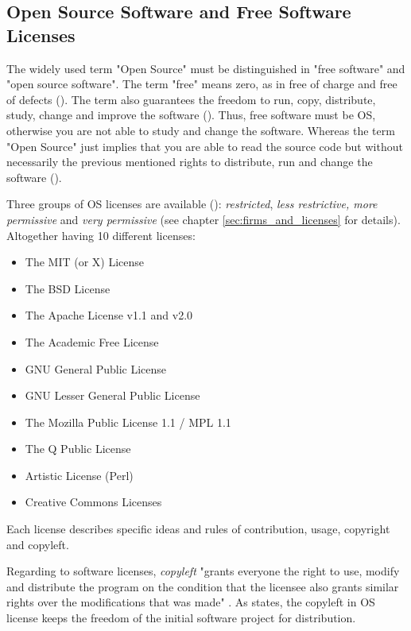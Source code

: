 \subsection{Open Source Software and Free Software Licenses}

The widely used term "Open Source" must be distinguished in "free software" and "open source software". The term "free" means zero, as in free of charge and free of defects (\cite{licensing2004software}). The term also guarantees the freedom to run, copy, distribute, study, change and improve the software (\cite{whatisfreesoftware:online}). Thus, free software must be OS, otherwise you are not able to study and change the software. Whereas the term "Open Source" just implies that you are able to read the source code but without necessarily the previous mentioned rights to distribute, run and change the software (\cite{whyfreesoftwareisbetterthanopensource:online}).

Three groups of OS licenses are available (\cite{laurent2004understanding}): \textit{restricted}, \textit{less restrictive, more permissive} and \textit{very permissive} (see chapter \ref{sec:firms_and_licenses} for details). Altogether having 10 different licenses:

\begin{itemize}
	\item The MIT (or X) License
  \item The BSD License
  \item The Apache License v1.1 and v2.0
  \item The Academic Free License
  \item GNU General Public License
  \item GNU Lesser General Public License
  \item The Mozilla Public License 1.1 / MPL 1.1
  \item The Q Public License
  \item Artistic License (Perl)
  \item Creative Commons Licenses
\end{itemize}

Each license describes specific ideas and rules of contribution, usage, copyright and copyleft.

Regarding to software licenses, \textit{copyleft} "grants everyone the right to use, modify and distribute the program on the condition that the licensee also grants similar rights over the modifications that was made" \cite[p.101]{mustonen2003copyleft}. As \cite{copyleftgnu:online} states, the copyleft in OS license keeps the freedom of the initial software project for distribution.

